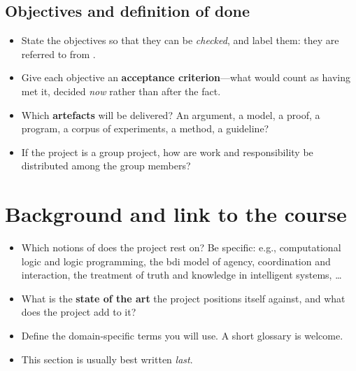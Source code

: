 \documentclass[11pt,a4paper]{scrartcl}
\begin{document}
\subsection{Objectives and definition of done}
\label{sec:objectives}

\begin{guidance}
\begin{itemize}
  \item State the objectives so that they can be \emph{checked}, and label them: they are referred to from .
  \item Give each objective an \textbf{acceptance criterion}—what would count as having met it, decided \emph{now} rather than after the fact.
  \item Which \textbf{artefacts} will be delivered?
  An argument, a model, a proof, a program, a corpus of experiments, a method, a guideline?

  \item If the project is a group project, how are work and responsibility be distributed among the group members?
\end{itemize}
\end{guidance}

\section{Background and link to the course}
\label{sec:background}

\begin{guidance}
\begin{itemize}
  \item Which notions of \coursetitlelong{} does the project rest on? 
  Be specific: e.g., computational logic and logic programming, the \ac{bdi} model of agency, coordination and interaction, the treatment of truth and knowledge in intelligent systems, \ldots{}

  \item What is the \textbf{state of the art} the project positions itself against, and what does the project add to it?

  \item Define the domain-specific terms you will use.
  A short glossary is welcome.

  \item This section is usually best written \emph{last}.
\end{itemize}
\end{guidance}
\end{document}
